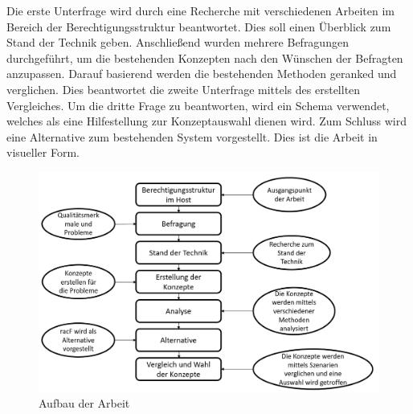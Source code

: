Die erste Unterfrage wird durch eine Recherche mit verschiedenen Arbeiten im Bereich der Berechtigungsstruktur beantwortet.
Dies soll einen Überblick zum Stand der Technik geben.
Anschließend wurden mehrere Befragungen durchgeführt, um die bestehenden Konzepten nach den Wünschen der Befragten anzupassen.
Darauf basierend werden die bestehenden Methoden geranked und verglichen.
Dies beantwortet die zweite Unterfrage mittels des erstellten Vergleiches.
\newline
Um die dritte Frage zu beantworten, wird ein Schema verwendet, welches als eine Hilfestellung zur Konzeptauswahl dienen wird.
Zum Schluss wird eine Alternative zum bestehenden System vorgestellt.
Dies ist die Arbeit in visueller Form.
\newpage
\begin{figure}[h!]
\hspace*{-3cm}
 \centering
 \includegraphics[width=1.5\textwidth]{gfx/Picture/Vorgehen.PNG}
 \caption{Aufbau der Arbeit}
 \label{fig:vorgehen}
\end{figure}
\newpage
